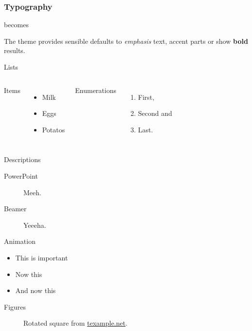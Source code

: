 \documentclass[10pt, compress]{beamer}
\begin{document}
\begin{frame}[fragile]
  \frametitle{Typography}

  \begin{center}becomes\end{center}

  The theme provides sensible defaults to \emph{emphasis} text,
  \alert{accent} parts or show \textbf{bold} results.
\end{frame}
\begin{frame}{Lists}
  \begin{columns}[onlytextwidth]
      Items
      \begin{itemize}
        \item Milk \item Eggs \item Potatos
      \end{itemize}

      Enumerations
      \begin{enumerate}
        \item First, \item Second and \item Last.
      \end{enumerate}
  \end{columns}
\end{frame}
\begin{frame}{Descriptions}
  \begin{description}
    \item[PowerPoint] Meeh.
    \item[Beamer] Yeeeha.
  \end{description}
\end{frame}
\begin{frame}{Animation}
  \begin{itemize}[<+- | alert@+>]
    \item \alert<4>{This is important}
    \item Now this
    \item And now this
  \end{itemize}
\end{frame}
\begin{frame}{Figures}
  \begin{figure}
    \caption{Rotated square from
    \href{http://www.texample.net/tikz/examples/rotated-polygons/}{texample.net}.}
  \end{figure}
\end{frame}
\end{document}
